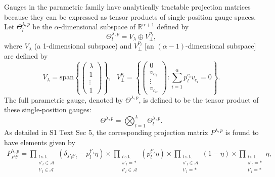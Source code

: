 \documentclass[10pt,letterpaper]{article}
\newcommand{\si}[1]{{S1 Text Sec #1}}
\begin{document}
Gauges in the parametric family have analytically tractable projection matrices because they can be expressed as tensor products of single-position gauge spaces. Let $\Theta^{\lambda,p}_l$ be the $\alpha$-dimensional subspace of $\mathbb{R}^{\alpha+1}$ defined by
\begin{equation}
    \Theta^{\lambda,p}_l = V_\lambda \oplus V_\perp^{p_l},
\end{equation}
where $V_\lambda$ (a 1-dimensional subspace) and $V_\perp^{p_l}$ [an $(\alpha-1)$-dimensional subspace] are defined by
\begin{equation}
    V_\lambda = \textrm{span} 
        \left\{\!\!
        \left(\!\!
        \begin{array}{c} 
            \lambda \\ 
            1 \\
            \vdots \\
            1 
        \end{array}
        \!\!\right)\!\!
        \right\},~~~
    V_\perp^{p_l} = 
        \left\{ \!\!
        \left( \!\!\!
        \begin{array}{c} 
            0 \\ 
            v_{c_1} \\
            \vdots \\
            v_{c_\alpha} 
        \end{array}
        \!\!\!\right)\!\!
        : \! \sum_{i=1}^\alpha p_l^{c_i} v_{c_i} = 0
        \! \right\}. 
\end{equation}
The full parametric gauge, denoted by $\Theta^{\lambda,p}$, is defined to be the tensor product of these single-position gauges:
\begin{equation}
    \Theta^{\lambda,p} = \bigotimes_{l=1}^L \Theta^{\lambda,p}_l. \label{eq:parametric_gauge_def}
\end{equation}
As detailed in \si{5}, the corresponding projection matrix $P^{\lambda,p}$ is found to have elements given by
\begin{eqnarray}
    P^{\lambda,p}_{s' t'} 
        =\!\!\!
        \prod_{\substack{l\ \textrm{s.t.}\ \\ s'_l \in \mathcal{A} \\ t'_l \in \mathcal{A}  } }\!\!\! \left(\delta_{s'_l t'_l} - p^{t'_l}_l \eta \right)\!
        \times \!\!\!
        \prod_{\substack{l\ \textrm{s.t.}\ \\  s'_l = * \\ t'_l\in \mathcal{A} } }\!\!\! \left(p^{t'_l}_l \eta \right) \!
        \times \!\!\!
        \prod_{\substack{l\ \textrm{s.t.}\ \\ s'_l\in \mathcal{A} \\ t'_l = * } }\!\!\! \left(1 - \eta \right) \!
        \times \!\!\!
        \prod_{\substack{l\ \textrm{s.t.}\ \\ s'_l = * \\ t'_l = *} } \!\! \eta,
    \label{eq:projection_matrix}
\end{eqnarray}
\end{document}
